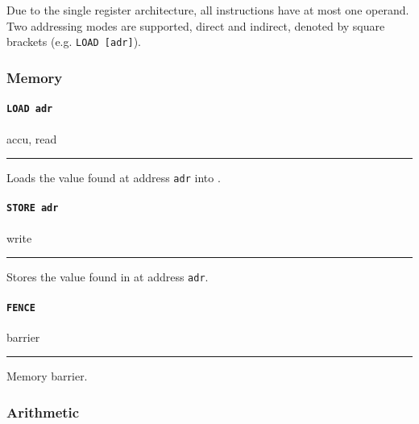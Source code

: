 Due to the single register architecture, all instructions have at most one operand.
Two addressing modes are supported, direct and indirect, denoted by square brackets (e.g. \texttt{LOAD [adr]}).


\newcommand{\oprule}{\rule[0.5\baselineskip]{\textwidth}{0.1pt}\vspace{-0.5\baselineskip}\par\noindent}

\newcommand{\defop}[3]{
  \paragraph{#1} \hfill #2
  \rule[0.5\baselineskip]{\textwidth}{0.1pt}\vspace{-0.5\baselineskip}\par\noindent
  #3
}

\newcommand{\defopnew}[4]{
  \par\noindent
  \begin{tabu} to \textwidth {X[l]X[l]X[r]}
    #1 & #2 & #3
  \end{tabu}
  \rule[0.5\baselineskip]{\textwidth}{0.1pt}\vspace{-0.5\baselineskip}
  #4
}


\newpage
\subsubsection{Memory}

\defop
{\texttt{LOAD adr}}
{accu, read}
{Loads the value found at address \texttt{adr} into \accu.}

\defop
{\texttt{STORE adr}}
{write}
{Stores the value found in \accu{} at address \texttt{adr}.}

\defop
{\texttt{FENCE}}
{barrier}
{Memory barrier.}

\subsubsection{Arithmetic}

